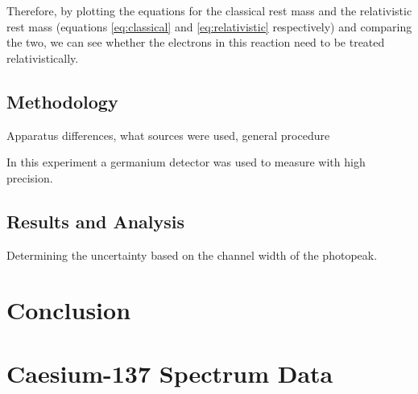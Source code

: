 \documentclass[%
reprint,
amsmath,amssymb,
aps,
]{revtex4-2}
\begin{document}
		Therefore, by plotting the equations for the classical rest mass and the relativistic rest mass (equations \ref{eq:classical} and \ref{eq:relativistic} respectively) and comparing the two, we can see whether the electrons in this reaction need to be treated relativistically.		
		
		\subsection{Methodology}
			Apparatus differences, what sources were used, general procedure	
		
			In this experiment a germanium detector was used to measure with high precision.
		
		\subsection{Results and Analysis}
			Determining the uncertainty based on the channel width of the photopeak.


	\section{Conclusion}

		
		
	\clearpage
	
	\clearpage
	\onecolumngrid
	\appendix
	\section{Caesium-137 Spectrum Data}
	
\end{document}
